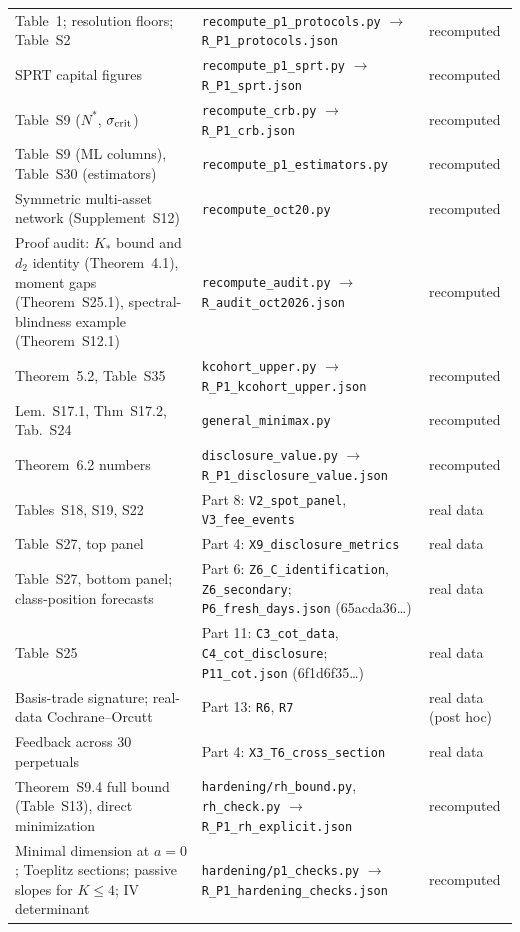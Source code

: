 \documentclass[12pt]{article}
\theoremstyle{definition}
\theoremstyle{remark}
\begin{document}
\begin{longtable}{p{}p{}p{}}
Table~1; resolution floors; Table~S2 & \texttt{recompute\_p1\_protocols.py} $\to$ \texttt{R\_P1\_protocols.json} & recomputed\\
SPRT capital figures & \texttt{recompute\_p1\_sprt.py} $\to$ \texttt{R\_P1\_sprt.json} & recomputed\\
Table~S9 ($N^*$, $\sigma_{\rm crit}$) & \texttt{recompute\_crb.py} $\to$ \texttt{R\_P1\_crb.json} & recomputed\\
Table~S9 (ML columns), Table~S30 (estimators) & \texttt{recompute\_p1\_estimators.py} & recomputed\\
Symmetric multi-asset network (Supplement~S12) & \texttt{recompute\_oct20.py} & recomputed\\
Proof audit: $K_*$ bound and $d_2$ identity (Theorem~4.1), moment gaps (Theorem~S25.1), spectral-blindness example (Theorem~S12.1) & \texttt{recompute\_audit.py} $\to$ \texttt{R\_audit\_oct2026.json} & recomputed\\
Theorem~5.2, Table~S35 & \texttt{kcohort\_upper.py} $\to$ \texttt{R\_P1\_kcohort\_upper.json} & recomputed\\
Lem.~S17.1, Thm~S17.2, Tab.~S24 & \texttt{general\_minimax.py} & recomputed\\
Theorem~6.2 numbers & \texttt{disclosure\_value.py} $\to$ \texttt{R\_P1\_disclosure\_value.json} & recomputed\\
Tables~S18, S19, S22 & Part 8: \texttt{V2\_spot\_panel}, \texttt{V3\_fee\_events} & real data\\
Table~S27, top panel & Part 4: \texttt{X9\_disclosure\_metrics} & real data\\
Table~S27, bottom panel; class-position forecasts & Part 6: \texttt{Z6\_C\_identification}, \texttt{Z6\_secondary}; \texttt{P6\_fresh\_days.json} (65acda36\ldots) & real data\\
Table~S25 & Part 11: \texttt{C3\_cot\_data}, \texttt{C4\_cot\_disclosure}; \texttt{P11\_cot.json} (6f1d6f35\ldots) & real data\\
Basis-trade signature; real-data Cochrane--Orcutt & Part 13: \texttt{R6}, \texttt{R7} & real data (post hoc)\\
Feedback across 30 perpetuals & Part 4: \texttt{X3\_T6\_cross\_section} & real data\\
Theorem~S9.4 full bound (Table~S13), direct minimization & \texttt{hardening/rh\_bound.py}, \texttt{rh\_check.py} $\to$ \texttt{R\_P1\_rh\_explicit.json} & recomputed\\
Minimal dimension at $a=0$; Toeplitz sections; passive slopes for $K\le4$; IV determinant & \texttt{hardening/p1\_checks.py} $\to$ \texttt{R\_P1\_hardening\_checks.json} & recomputed\\

\end{longtable}
\end{document}
